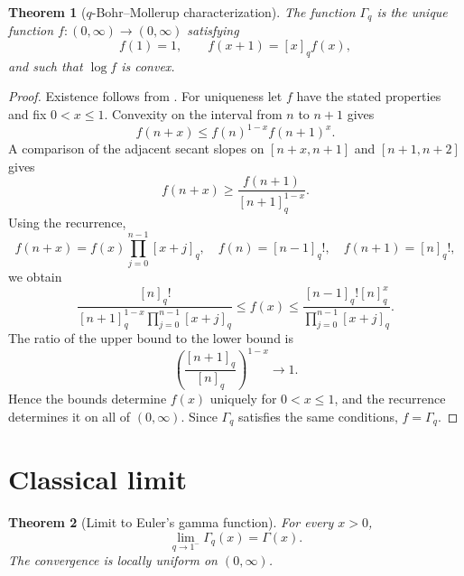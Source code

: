 \documentclass[11pt,oneside,openany]{book}
\newtheorem{theorem}{Theorem}[chapter]
\theoremstyle{definition}
\theoremstyle{remark}
\begin{document}
\begin{theorem}[$q$-Bohr--Mollerup characterization]\label{thm:q-bohr-mollerup}
The function $\Gamma_q$ is the unique function $f:(0,\infty)\to(0,\infty)$ satisfying
\[
 f(1)=1,
 \qquad
 f(x+1)=[x]_qf(x),
\]
and such that $\log f$ is convex.
\end{theorem}

\begin{proof}
Existence follows from .  For uniqueness let $f$ have the stated properties and fix $0<x\le1$.  Convexity on the interval from $n$ to $n+1$ gives
\[
 f(n+x)\le f(n)^{1-x}f(n+1)^x.
\]
A comparison of the adjacent secant slopes on $[n+x,n+1]$ and $[n+1,n+2]$ gives
\[
 f(n+x)\ge\frac{f(n+1)}{[n+1]_q^{1-x}}.
\]
Using the recurrence,
\[
 f(n+x)=f(x)\prod_{j=0}^{n-1}[x+j]_q,
 \quad
 f(n)=[n-1]_q!,
 \quad
 f(n+1)=[n]_q!,
\]
we obtain
\[
 \frac{[n]_q!}
 {[n+1]_q^{1-x}\prod_{j=0}^{n-1}[x+j]_q}
 \le f(x)\le
 \frac{[n-1]_q![n]_q^x}
 {\prod_{j=0}^{n-1}[x+j]_q}.
\]
The ratio of the upper bound to the lower bound is
\[
 \left(\frac{[n+1]_q}{[n]_q}\right)^{1-x}\longrightarrow1.
\]
Hence the bounds determine $f(x)$ uniquely for $0<x\le1$, and the recurrence determines it on all of $(0,\infty)$.  Since $\Gamma_q$ satisfies the same conditions, $f=\Gamma_q$.
\end{proof}

\section{Classical limit}

\begin{theorem}[Limit to Euler's gamma function]\label{thm:qgamma-classical-limit}
For every $x>0$,
\[
 \lim_{q\to1^-}\Gamma_q(x)=\Gamma(x).
\]
The convergence is locally uniform on $(0,\infty)$.
\end{theorem}
\end{document}
